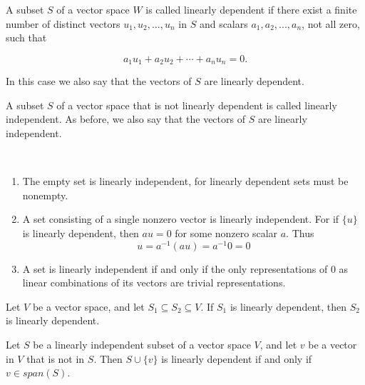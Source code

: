\begin{defn}
	A subset $S$ of a vector space $W$ is called linearly dependent if there exist a finite number of distinct vectors $u_1, u_2, . . . , u_n$ in $S$ and scalars $a_1,a_2,...,a_n$, not all zero, such that 
	
		$$a_1u_1 + a_2u_2 +\cdots +a_nu_n = 0 .$$
	
In this case we also say that the vectors of $S$ are linearly dependent.

\end{defn}

\begin{defn}
	A subset $S$ of a vector space that is not linearly dependent is called linearly independent. As before, we also say that the vectors of $S$ are linearly independent.
\end{defn}

\begin{rmk*}$ $
	\begin{enumerate}
		\item The empty set is linearly independent, for linearly dependent sets must be nonempty.
		\item A set consisting of a single nonzero vector is linearly independent. For if $\{u\}$ is linearly dependent, then $au = 0$ for some nonzero scalar $a$. Thus
			$$ u = a^{-1}(au) = a^{-1} 0 = 0 $$
		\item A set is linearly independent if and only if the only representations of $0$ as linear combinations of its vectors are trivial representations.
	\end{enumerate}
\end{rmk*}

\begin{thm}%
	Let $V$ be a vector space, and let $S_1 \subseteq S_2 \subseteq V$. If $S_1$ is linearly dependent, then $S_2$ is linearly dependent.
\end{thm}




\begin{cor}%
	Let $S$ be a linearly independent subset of a vector space $V$, and let $v$ be a vector in $V$ that is not in $S$. Then $S \cup \{v\}$ is linearly dependent if and only if $v \in span(S)$.
\end{cor}





